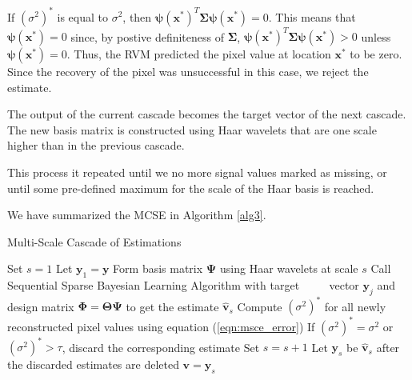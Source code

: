 If $(\sigma^2)^*$ is equal to $\sigma^2$, then $\bm\psi(\bm x^*)^T\bm\Sigma\bm\psi(\bm x^*) = 0$. 
This means that $\bm\psi(\bm x^*) = 0$ since, by postive definiteness of $\bm\Sigma$, $\bm\psi(\bm x^*)^T\bm\Sigma\bm\psi(\bm x^*) > 0$ unless $\bm\psi(\bm x^*) = 0$.
Thus, the RVM predicted the pixel value at location $\bm x^*$ to be zero. 
Since the recovery of the pixel was unsuccessful in this case, we reject the estimate.

The output of the current cascade becomes the target vector of the next cascade.
The new basis matrix is constructed using Haar wavelets that are one scale higher than in the previous cascade.

This process it repeated until we no more signal values marked as missing, or until some pre-defined maximum for the scale of the Haar basis is reached.

We have summarized the MCSE in Algorithm \ref{alg3}.

\begin{algorithm}
  \caption{Multi-Scale Cascade of Estimations \cite{pilikos2014}}
  \label{alg3}
  \begin{algorithmic}[1]
    \State Set $s=1$
    \State Let $\bm y_1 = \bm y$
    \State Form basis matrix $\bm\Psi$ using Haar wavelets at scale $s$
    \State Call Sequential Sparse Bayesian Learning Algorithm with target
    \Statex $\qquad$ vector $\bm y_j$ and design matrix $\bm\Phi=\bm\Theta\bm\Psi$ to get the estimate $\bm{\hat v}_s$
    \State Compute $(\sigma^2)^*$ for all newly reconstructed pixel values using equation (\ref{eqn:msce_error})
    \State If $(\sigma^2)^* = \sigma^2$ or $(\sigma^2)^* > \tau$, discard the corresponding estimate
    \State Set $s = s+1$
    \State Let $\bm y_s$ be $\bm{\hat v}_s$ after the discarded estimates are deleted
    \EndWhile
    \State\Return $\bm v = \bm y_s$
  \end{algorithmic}
\end{algorithm}

